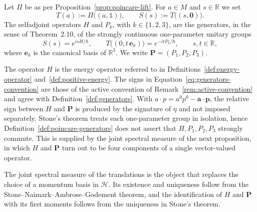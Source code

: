 \begin{definition}\label{def:poincare-generators}
	Let $\Pi$ be as per Proposition~\ref{prop:poincare-lift}. For $a\in M$ and $s\in\mathbb{R}$ we set
	\begin{equation*}
		T(a):=\Pi\big((a,\mathbb{1})\big), \qquad S(s):=T\big((s,\mathbf{0})\big).
	\end{equation*}
	The selfadjoint operators $H$ and $P_k$, with $k\in\{1,2,3\}$, are the generators, in the sense of Theorem~2.10, of the strongly continuous one-parameter unitary groups
	\begin{equation}\label{eq:generators-convention}
		S(s)=e^{isH/\hbar}, \qquad T\big((0,t\,\mathbf{e}_k)\big)=e^{-itP_k/\hbar}, \qquad s,t\in\mathbb{R},
	\end{equation}
	where $\mathbf{e}_k$ is the canonical basis of $\mathbb{R}^3$. We write $\mathbf{P}=(P_1,P_2,P_3)$.
\end{definition}

\begin{remark}\label{rem:generators-conventions}
	The operator $H$ is the energy operator referred to in Definitions~\ref{def:energy-operator} and~\ref{def:positive-energy}. The signs in Equation~\eqref{eq:generators-convention} are those of the active convention of Remark~\ref{rem:active-convention} and agree with Definition~\ref{def:generators}. With $a\cdot p=a^0p^0-\mathbf{a}\cdot\mathbf{p}$, the relative sign between $H$ and $\mathbf{P}$ is produced by the signature of $\eta$ and not imposed separately. Stone's theorem treats each one-parameter group in isolation, hence Definition~\ref{def:poincare-generators} does not assert that $H,P_1,P_2,P_3$ strongly commute. This is supplied by the joint spectral measure of the next proposition, in which $H$ and $\mathbf{P}$ turn out to be four components of a single vector-valued operator.
\end{remark}

The joint spectral measure of the translations is the object that replaces the choice of a momentum basis in $\mathcal{H}$. Its existence and uniqueness follow from the Stone--Naimark--Ambrose--Godement theorem, and the identification of $H$ and $\mathbf{P}$ with its first moments follows from the uniqueness in Stone's theorem.

